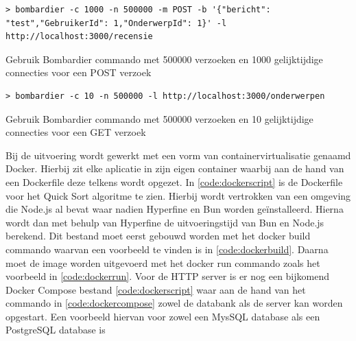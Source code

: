 \begin{listing}[H]
  \centering
  \begin{verbatim}
> bombardier -c 1000 -n 500000 -m POST -b '{"bericht": "test","GebruikerId": 1,"OnderwerpId": 1}' -l http://localhost:3000/recensie
      \end{verbatim}
      \caption{\label{code:Bombardier1000}Gebruik Bombardier commando met 500000 verzoeken en 1000 gelijktijdige connecties voor een POST verzoek}
\end{listing}
\begin{listing}[H]
  \centering
  \begin{verbatim}
> bombardier -c 10 -n 500000 -l http://localhost:3000/onderwerpen
      \end{verbatim}
      \caption{\label{code:Bombardier10GET}Gebruik Bombardier commando met 500000 verzoeken en 10 gelijktijdige connecties voor een GET verzoek}
\end{listing}
Bij de uitvoering wordt gewerkt met een vorm van containervirtualisatie genaamd Docker.
Hierbij zit elke aplicatie in zijn eigen container waarbij aan de hand van een Dockerfile deze telkens wordt opgezet.
In \ref{code:dockerscript} is de Dockerfile voor het Quick Sort algoritme te zien. 
Hierbij wordt vertrokken van een omgeving die Node.js al bevat waar nadien Hyperfine en Bun worden geïnstalleerd.
Hierna wordt dan met behulp van Hyperfine de uitvoeringstijd van Bun en Node.js berekend.
Dit bestand moet eerst gebouwd worden met het docker build commando waarvan een voorbeeld te vinden is in \ref{code:dockerbuild}.
Daarna moet de image worden uitgevoerd met het docker run commando zoals het voorbeeld in \ref{code:dockerrun}.
Voor de HTTP server is er nog een bijkomend
Docker Compose bestand \ref{code:dockerscript} waar aan de hand van het commando in \ref{code:dockercompose}
zowel de databank als de server kan worden opgestart. Een voorbeeld hiervan voor zowel een MysSQL database als een PostgreSQL database is 
